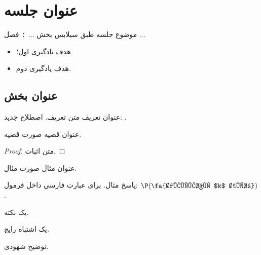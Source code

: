 \chapter{عنوان جلسه}
\label{ch:sX}

{موضوع جلسه طبق سیلابس}
{ بخش ... \,؛\,  فصل ...}
{\begin{itemize}
  \item هدف یادگیری اول؛
  \item هدف یادگیری دوم.
\end{itemize}}

\section{عنوان بخش}

\begin{definition}[label=def:sample]{عنوان تعریف}
متن تعریف. اصطلاح جدید: .
\end{definition}

\begin{theorem}[label=thm:sample]{عنوان قضیه}
صورت قضیه.
\end{theorem}

\begin{proof}
متن اثبات.
\end{proof}

\begin{example}{عنوان مثال}
صورت مثال.
\begin{solution}
پاسخ مثال. برای عبارت فارسی داخل فرمول: $\P(\fa{دقیقاً $k$ شیر})$.
\end{solution}
\end{example}

\begin{note} یک نکته. \end{note}
\begin{warning} یک اشتباه رایج. \end{warning}
\begin{intuition} توضیح شهودی. \end{intuition}

\begin{figblock}

\end{figblock}

